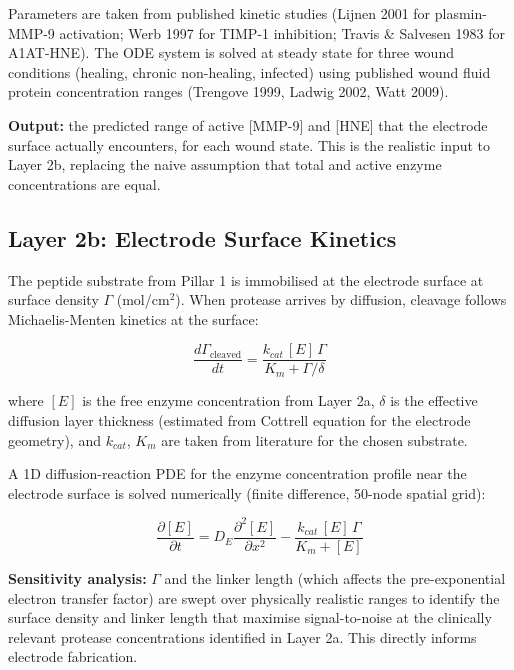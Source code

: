 \documentclass[10pt,a4paper]{article}
\begin{document}
Parameters are taken from published kinetic studies (Lijnen 2001 for
plasmin-MMP-9 activation; Werb 1997 for TIMP-1 inhibition;
Travis \& Salvesen 1983 for A1AT-HNE).  The ODE system is solved at
steady state for three wound conditions (healing, chronic non-healing,
infected) using published wound fluid protein concentration ranges
(Trengove 1999, Ladwig 2002, Watt 2009).

\textbf{Output:} the predicted range of active [MMP-9] and [HNE] that
the electrode surface actually encounters, for each wound state.
This is the realistic input to Layer 2b, replacing the naive assumption
that total and active enzyme concentrations are equal.

\subsection{Layer 2b: Electrode Surface Kinetics}

The peptide substrate from Pillar 1 is immobilised at the electrode
surface at surface density $\Gamma$ (mol/cm$^2$).  When protease
arrives by diffusion, cleavage follows Michaelis-Menten kinetics
at the surface:

\begin{equation}
  \frac{d\Gamma_\text{cleaved}}{dt}
  = \frac{k_{cat}\,[E]\,\Gamma}
         {K_m + \Gamma / \delta}
\end{equation}

where $[E]$ is the free enzyme concentration from Layer 2a, $\delta$
is the effective diffusion layer thickness (estimated from Cottrell
equation for the electrode geometry), and $k_{cat}$, $K_m$ are
taken from literature for the chosen substrate.

A 1D diffusion-reaction PDE for the enzyme concentration profile
near the electrode surface is solved numerically (finite difference,
50-node spatial grid):

\begin{equation}
  \frac{\partial [E]}{\partial t}
  = D_E \frac{\partial^2 [E]}{\partial x^2}
  - \frac{k_{cat}\,[E]\,\Gamma}{K_m + [E]}
\end{equation}

\textbf{Sensitivity analysis:} $\Gamma$ and the linker length (which
affects the pre-exponential electron transfer factor) are swept over
physically realistic ranges to identify the surface density and linker
length that maximise signal-to-noise at the clinically relevant
protease concentrations identified in Layer 2a.  This directly
informs electrode fabrication.
\end{document}
